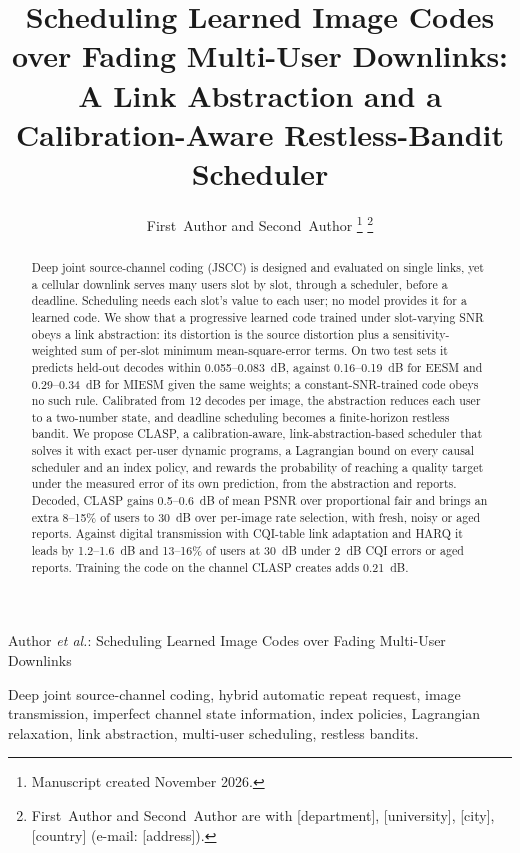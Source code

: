 \documentclass[lettersize,journal]{IEEEtran}
\begin{document}
\title{Scheduling Learned Image Codes over Fading Multi-User Downlinks: A Link Abstraction and a Calibration-Aware Restless-Bandit Scheduler}

\author{First~Author and Second~Author
\thanks{Manuscript created November 2026.}
\thanks{First~Author and Second~Author are with [department], [university], [city], [country]
(e-mail: [address]).}}

%
{Author \MakeLowercase{\textit{et al.}}: Scheduling Learned Image Codes over Fading Multi-User Downlinks}

\maketitle

\begin{abstract}
Deep joint source-channel coding (JSCC) is designed and evaluated on single links, yet a cellular downlink serves many users slot by slot, through a scheduler, before a deadline. Scheduling needs each slot's value to each user; no model provides it for a learned code. We show that a progressive learned code trained under slot-varying SNR obeys a link abstraction: its distortion is the source distortion plus a sensitivity-weighted sum of per-slot minimum mean-square-error terms. On two test sets it predicts held-out decodes within 0.055--0.083~dB, against 0.16--0.19~dB for EESM and 0.29--0.34~dB for MIESM given the same weights; a constant-SNR-trained code obeys no such rule. Calibrated from 12 decodes per image, the abstraction reduces each user to a two-number state, and deadline scheduling becomes a finite-horizon restless bandit. We propose CLASP, a calibration-aware, link-abstraction-based scheduler that solves it with exact per-user dynamic programs, a Lagrangian bound on every causal scheduler and an index policy, and rewards the probability of reaching a quality target under the measured error of its own prediction, from the abstraction and reports. Decoded, CLASP gains 0.5--0.6~dB of mean PSNR over proportional fair and brings an extra 8--15\% of users to 30~dB over per-image rate selection, with fresh, noisy or aged reports. Against digital transmission with CQI-table link adaptation and HARQ it leads by 1.2--1.6~dB and 13--16\% of users at 30~dB under 2~dB CQI errors or aged reports. Training the code on the channel CLASP creates adds 0.21~dB.
\end{abstract}

\begin{IEEEkeywords}
Deep joint source-channel coding, hybrid automatic repeat request, image transmission, imperfect channel state information, index policies, Lagrangian relaxation, link abstraction, multi-user scheduling, restless bandits.
\end{IEEEkeywords}
\end{document}
